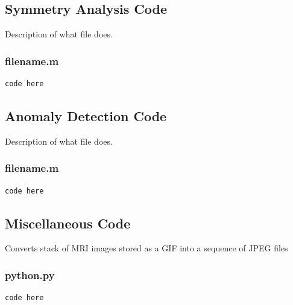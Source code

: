 \documentclass[12pt]{article}
\theoremstyle{plain}%
\theoremstyle{definition}
\theoremstyle{remark}
\begin{document}
\subsection{Symmetry Analysis Code}
Description of what file does.
\subsubsection{filename.m}
\begin{verbatim}
code here
\end{verbatim}

\subsection{Anomaly Detection Code}
Description of what file does.
\subsubsection{filename.m}
\begin{verbatim}
code here
\end{verbatim}

\subsection{Miscellaneous Code}
Converts stack of MRI images stored as a GIF into a sequence of JPEG files
\subsubsection{python.py}
\begin{verbatim}
code here
\end{verbatim}
\end{document}

